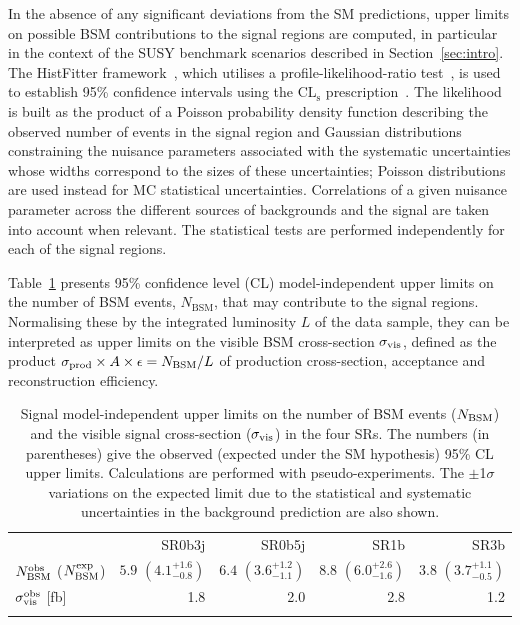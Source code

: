 In the absence of any significant deviations from the SM predictions, upper limits on possible BSM contributions to the signal regions are computed, 
in particular in the context of the SUSY benchmark scenarios described in Section~\ref{sec:intro}. 
The HistFitter framework~\cite{Baak:2014wma}, which utilises a profile-likelihood-ratio test~\cite{Cowan:2010js}, 
is used to establish 95\% confidence intervals using the CL$_\mathrm{s}$ prescription~\cite{Read_CLs}. 
The likelihood is built as the product of a Poisson probability density function describing the observed number of events in the signal region 
and Gaussian distributions constraining the nuisance parameters 
associated with the systematic uncertainties whose widths correspond to the sizes of these uncertainties; 
Poisson distributions are used instead for MC statistical uncertainties. 
Correlations of a given nuisance parameter across the different sources of backgrounds and the signal are taken into account when relevant. 
The statistical tests are performed independently for each of the signal regions. 

Table~\ref{tab:upperlimits} presents 95\% confidence level (CL) model-independent upper limits 
on the number of BSM events, $N_\mathrm{BSM}$, that may contribute to the signal regions. 
Normalising these by the integrated luminosity $L$ of the data sample, they can be interpreted as upper limits on the visible BSM cross-section $\sigma_{\rm{vis}}$, 
defined as the product $\sigma_{\rm{prod}}\times A \times\epsilon=N_\mathrm{BSM}/L$ of production cross-section, acceptance and reconstruction efficiency. 

\begin{table}[htb!]
\centering
\caption{Signal model-independent upper limits on the number of BSM events ($N_{\rm{BSM}}$) 
  and the visible signal cross-section ($\sigma_{\rm{vis}}$) in the four SRs. 
  The numbers (in parentheses) give the observed (expected under the SM hypothesis) 95\% CL upper
  limits. Calculations are performed with pseudo-experiments.
  The $\pm$1$\sigma$ variations on the expected limit due to the statistical and systematic uncertainties in the background prediction are also shown. 
}
\label{tab:upperlimits}
{\small
\renewcommand{\arraystretch}{1.4}
\begin{tabular*}{\textwidth}{@{\extracolsep{\fill}}lrrrr}
\noalign{\smallskip}\hline\hline\noalign{\smallskip}
         & SR0b3j         & SR0b5j     & SR1b & SR3b     \\[-0.05cm]
\noalign{\smallskip}\hline\hline\noalign{\smallskip}
$N_{\rm{BSM}}^{\rm{obs}}$ ($N_{\rm{BSM}}^{\rm{exp}}$) 
 & $5.9$  $({4.1}^{+1.6}_{-0.8})$
 & $6.4$ $({3.6}^{+1.2}_{-1.1})$
 & $8.8$ $({6.0}^{+2.6}_{-1.6})$ 
 & $3.8$ $({3.7}^{+1.1}_{-0.5})$ \\
$\sigma_{\rm{vis}}^{\rm{obs}}$ [fb] & 1.8 & 2.0 & 2.8 & 1.2\\
\noalign{\smallskip}\hline\hline\noalign{\smallskip}
  \end{tabular*}
}
\end{table} 

